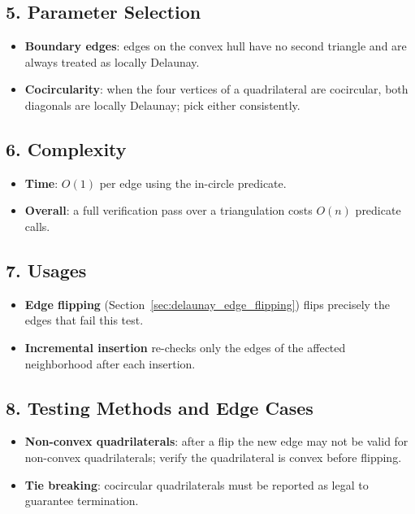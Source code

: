 \subsection{5. Parameter Selection}

\begin{itemize}
\item \textbf{Boundary edges}: edges on the convex hull have no second triangle
  and are always treated as locally Delaunay.
\item \textbf{Cocircularity}: when the four vertices of a quadrilateral are
  cocircular, both diagonals are locally Delaunay; pick either consistently.
\end{itemize}

\subsection{6. Complexity}

\begin{itemize}
\item \textbf{Time}: $O(1)$ per edge using the in-circle predicate.
\item \textbf{Overall}: a full verification pass over a triangulation costs
  $O(n)$ predicate calls.
\end{itemize}

\subsection{7. Usages}

\begin{itemize}
\item \textbf{Edge flipping} (Section~\ref{sec:delaunay_edge_flipping}) flips
  precisely the edges that fail this test.
\item \textbf{Incremental insertion} re-checks only the edges of the affected
  neighborhood after each insertion.
\end{itemize}

\subsection{8. Testing Methods and Edge Cases}

\begin{itemize}
\item \textbf{Non-convex quadrilaterals}: after a flip the new edge may not be
  valid for non-convex quadrilaterals; verify the quadrilateral is convex before
  flipping.
\item \textbf{Tie breaking}: cocircular quadrilaterals must be reported as legal
  to guarantee termination.
\end{itemize}

